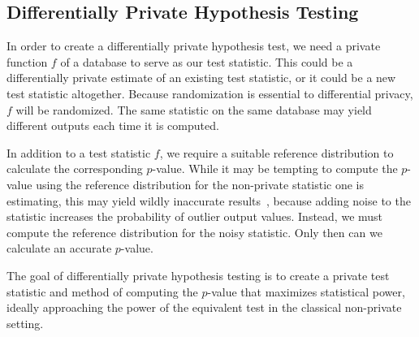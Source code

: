 \subsection{Differentially Private Hypothesis Testing}
In order to create a differentially private hypothesis test, we need a private function $f$ of a database to serve as our test statistic. This could be a differentially private estimate of an existing test statistic, or it could be a new test statistic altogether. Because randomization is essential to differential privacy, $f$ will be randomized. The same statistic on the same database may yield different outputs each time it is computed.

In addition to a test statistic $f$, we require a suitable reference distribution to calculate the corresponding $p$-value. While it may be tempting to compute the $p$-value using the reference distribution for the non-private statistic one is estimating, this may yield wildly inaccurate results~\cite{campbell2018diffprivanova}, because adding noise to the statistic increases the probability of outlier output values. Instead, we must compute the reference distribution for the noisy statistic. Only then can we calculate an accurate $p$-value. 

The goal of differentially private hypothesis testing is to create a private test statistic and method of computing the $p$-value that maximizes statistical power, ideally approaching the power of the equivalent test in the classical non-private setting.